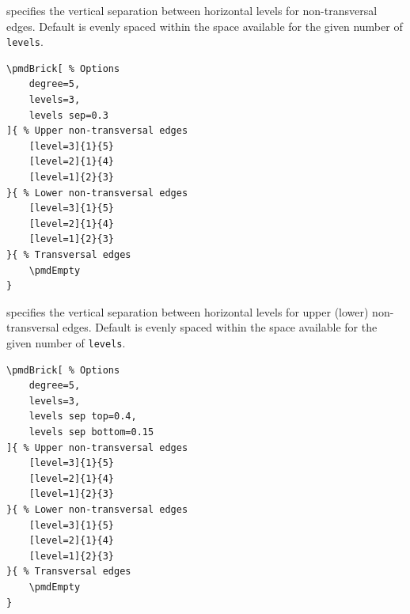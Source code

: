 \documentclass{ltxdoc}
\begin{document}
specifies the vertical separation between horizontal levels for non-transversal edges. Default is evenly spaced within the space available for the given number of \texttt{levels}.
\begin{center}
    \begin{minipage}{\dimexpr0.85\textwidth-2\fboxrule-2\fboxsep\relax}
        \begin{minipage}[c]{0.4\linewidth}
\begin{verbatim}
\pmdBrick[ % Options
    degree=5,
    levels=3,
    levels sep=0.3
]{ % Upper non-transversal edges
    [level=3]{1}{5}
    [level=2]{1}{4}
    [level=1]{2}{3}
}{ % Lower non-transversal edges
    [level=3]{1}{5}
    [level=2]{1}{4}
    [level=1]{2}{3}
}{ % Transversal edges
    \pmdEmpty
}
\end{verbatim}
        \end{minipage}
        \hfill
        \begin{minipage}[c]{0.4\linewidth}
        \end{minipage}
    \end{minipage}%
\end{center}

 
specifies the vertical separation between horizontal levels for upper (lower) non-transversal edges. Default is evenly spaced within the space available for the given number of \texttt{levels}.
\begin{center}
    \begin{minipage}{\dimexpr0.85\textwidth-2\fboxrule-2\fboxsep\relax}
        \begin{minipage}[c]{0.4\linewidth}
\begin{verbatim}
\pmdBrick[ % Options
    degree=5,
    levels=3,
    levels sep top=0.4,
    levels sep bottom=0.15
]{ % Upper non-transversal edges
    [level=3]{1}{5}
    [level=2]{1}{4}
    [level=1]{2}{3}
}{ % Lower non-transversal edges
    [level=3]{1}{5}
    [level=2]{1}{4}
    [level=1]{2}{3}
}{ % Transversal edges
    \pmdEmpty
}
\end{verbatim}
        \end{minipage}
        \hfill
        \begin{minipage}[c]{0.4\linewidth}
        \end{minipage}
    \end{minipage}%
\end{center}
\end{document}
